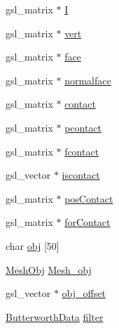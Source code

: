 \begin{DoxyCompactItemize}
gsl\-\_\-matrix $\ast$ \hyperlink{struct_stu_l_i_n_k_a20c577c90b1d497258ed3540242429f4}{I}
\item 
gsl\-\_\-matrix $\ast$ \hyperlink{struct_stu_l_i_n_k_a8d2c6f483124b5b3ca59de9469284fca}{vert}
\item 
gsl\-\_\-matrix $\ast$ \hyperlink{struct_stu_l_i_n_k_a99e5f5a020af1d03bd0325089ff4f7d3}{face}
\item 
gsl\-\_\-matrix $\ast$ \hyperlink{struct_stu_l_i_n_k_a0f61fb37e521836d2d8734e528d3f1ee}{normalface}
\item 
gsl\-\_\-matrix $\ast$ \hyperlink{struct_stu_l_i_n_k_abe10827abb6a597859be5a17e7cbc8c4}{contact}
\item 
gsl\-\_\-matrix $\ast$ \hyperlink{struct_stu_l_i_n_k_ac24419f76664edd80380489bd16d312f}{pcontact}
\item 
gsl\-\_\-matrix $\ast$ \hyperlink{struct_stu_l_i_n_k_a5a0cd5d6407d0dc3a132af32f3f50ab6}{fcontact}
\item 
gsl\-\_\-vector $\ast$ \hyperlink{struct_stu_l_i_n_k_a7d33662d0d2703ecb29b828e0047d7f0}{iscontact}
\item 
gsl\-\_\-matrix $\ast$ \hyperlink{struct_stu_l_i_n_k_af57173afe5aaff2961e6c34caf25d722}{pos\-Contact}
\item 
gsl\-\_\-matrix $\ast$ \hyperlink{struct_stu_l_i_n_k_aa924cfce43bc93867c49d2242431e0f2}{for\-Contact}
\item 
char \hyperlink{struct_stu_l_i_n_k_ae779e94b90b30c0e3bf144feba6ee036}{obj} \mbox{[}50\mbox{]}
\item 
\hyperlink{struct_mesh_obj}{Mesh\-Obj} \hyperlink{struct_stu_l_i_n_k_a0f14065425f2268e18ba131afa04584a}{Mesh\-\_\-obj}
\item 
gsl\-\_\-vector $\ast$ \hyperlink{struct_stu_l_i_n_k_a30ce35c26cd46c26cd83a0de1cfce268}{obj\-\_\-offset}
\item 
\hyperlink{struct_butterworth_data}{Butterworth\-Data} \hyperlink{struct_stu_l_i_n_k_a3e83ddc08e283d387b22a45830b49af3}{filter}
\end{DoxyCompactItemize}


